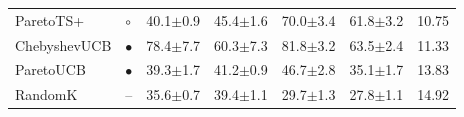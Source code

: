 \begin{tabular}{llrrrrr}
ParetoTS+ & $\circ$ & 40.1{\scriptsize$\pm$0.9} & 45.4{\scriptsize$\pm$1.6} & 70.0{\scriptsize$\pm$3.4} & 61.8{\scriptsize$\pm$3.2} & 10.75\\
ChebyshevUCB & $\bullet$ & 78.4{\scriptsize$\pm$7.7} & 60.3{\scriptsize$\pm$7.3} & 81.8{\scriptsize$\pm$3.2} & 63.5{\scriptsize$\pm$2.4} & 11.33\\
ParetoUCB & $\bullet$ & 39.3{\scriptsize$\pm$1.7} & 41.2{\scriptsize$\pm$0.9} & 46.7{\scriptsize$\pm$2.8} & 35.1{\scriptsize$\pm$1.7} & 13.83\\
RandomK & -- & 35.6{\scriptsize$\pm$0.7} & 39.4{\scriptsize$\pm$1.1} & 29.7{\scriptsize$\pm$1.3} & 27.8{\scriptsize$\pm$1.1} & 14.92\\
\bottomrule
\end{tabular}
